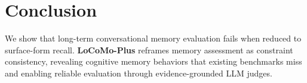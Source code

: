 \documentclass[11pt]{article}
\begin{document}
\section{Conclusion}

We show that long-term conversational memory evaluation fails when reduced to surface-form recall. \textbf{LoCoMo-Plus} reframes memory assessment as constraint consistency, revealing cognitive memory behaviors that existing benchmarks miss and enabling reliable evaluation through evidence-grounded LLM judges.



\end{document}
